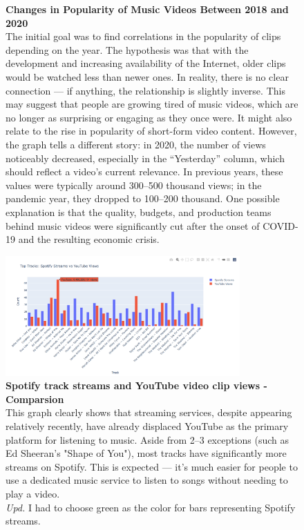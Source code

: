 \documentclass{article}
\begin{document}
\begin{figure}[htbp]
    \caption{\textbf{Changes in Popularity of Music Videos Between 2018 and 2020} \\
The initial goal was to find correlations in the popularity of clips depending on the year. The hypothesis was that with the development and increasing availability of the Internet, older clips would be watched less than newer ones. In reality, there is no clear connection — if anything, the relationship is slightly inverse. This may suggest that people are growing tired of music videos, which are no longer as surprising or engaging as they once were. It might also relate to the rise in popularity of short-form video content. However, the graph tells a different story: in 2020, the number of views noticeably decreased, especially in the “Yesterday” column, which should reflect a video's current relevance. In previous years, these values were typically around 300–500 thousand views; in the pandemic year, they dropped to 100–200 thousand. One possible explanation is that the quality, budgets, and production teams behind music videos were significantly cut after the onset of COVID-19 and the resulting economic crisis.}
    \label{fig:video_popularity_2018_2020}
\end{figure}

\clearpage

\begin{figure}[htbp]
    \centering
    \includegraphics[width=0.8\textwidth]{data/report_figures/graph10_radio_youtube.png}
    \caption{\textbf{Spotify track streams and YouTube video clip views - Comparsion} \\
    This graph clearly shows that streaming services, despite appearing relatively recently, have already displaced YouTube as the primary platform for listening to music. Aside from 2–3 exceptions (such as Ed Sheeran's "Shape of You"), most tracks have significantly more streams on Spotify. This is expected — it’s much easier for people to use a dedicated music service to listen to songs without needing to play a video.\\
\textit{Upd.} I had to choose green as the color for bars representing Spotify streams.}
    \label{fig:youtube_final}
\end{figure}
\end{document}
